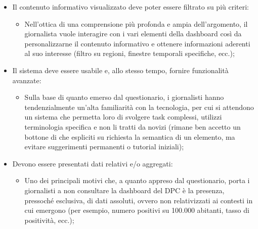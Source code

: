 \begin{itemize}
	\item Il contenuto informativo visualizzato deve poter essere filtrato su più criteri:
	\begin{itemize}
        \item Nell'ottica di una comprensione più profonda e ampia dell'argomento, il giornalista vuole interagire con i vari elementi della dashboard così da personalizzarne il contenuto informativo e ottenere informazioni aderenti al suo interesse (filtro su regioni, finestre temporali specifiche, ecc.);
    \end{itemize}
	\item Il sistema deve essere usabile e, allo stesso tempo, fornire funzionalità avanzate:
	\begin{itemize}
        \item Sulla base di quanto emerso dal questionario, i giornalisti hanno tendenzialmente un'alta familiarità con la tecnologia, per cui si attendono un sistema che permetta loro di svolgere task complessi, utilizzi terminologia specifica e non li tratti da novizi (rimane ben accetto un bottone di  che espliciti su richiesta la semantica di un elemento, ma evitare suggerimenti permanenti o tutorial iniziali);
    \end{itemize}
	\item Devono essere presentati dati relativi e/o aggregati:
	\begin{itemize}
        \item Uno dei principali motivi che, a quanto appreso dal questionario, porta i giornalisti a non consultare la dashboard del DPC è la presenza, pressoché esclusiva, di dati assoluti, ovvero non relativizzati ai contesti in cui emergono (per esempio, numero positivi su 100.000 abitanti, tasso di positività, ecc.);
    \end{itemize}
\end{itemize}
